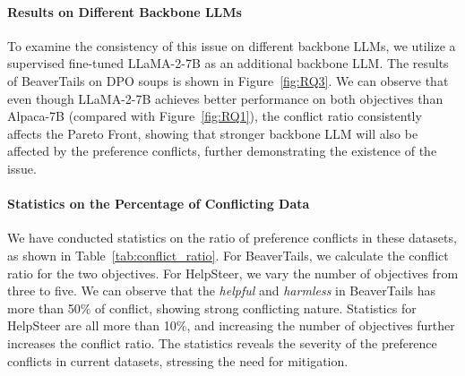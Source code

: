 \paragraph{Results on Different Backbone LLMs}
To examine the consistency of this issue on different backbone LLMs, we utilize a supervised fine-tuned LLaMA-2-7B as an additional backbone LLM.
The results of BeaverTails on DPO soups is shown in Figure~\ref{fig:RQ3}. 
We can observe that even though LLaMA-2-7B achieves better performance on both objectives than Alpaca-7B (compared with Figure~\ref{fig:RQ1}), the conflict ratio consistently affects the Pareto Front, showing that stronger backbone LLM will also be affected by the preference conflicts, further demonstrating the existence of the issue.  


\paragraph{Statistics on the Percentage of Conflicting Data}
We have conducted statistics on the ratio of preference conflicts in these datasets, as shown in Table~\ref{tab:conflict_ratio}. 
For BeaverTails, we calculate the conflict ratio for the two objectives. 
For HelpSteer, we vary the number of objectives from three to five. 
We can observe that the \textit{helpful} and \textit{harmless} in BeaverTails has more than 50\% of conflict, showing strong conflicting nature. 
Statistics for HelpSteer are all more than 10\%, and increasing the number of objectives further increases the conflict ratio. 
The statistics reveals the severity of the preference conflicts in current datasets, stressing the need for mitigation. 
\label{3.4}